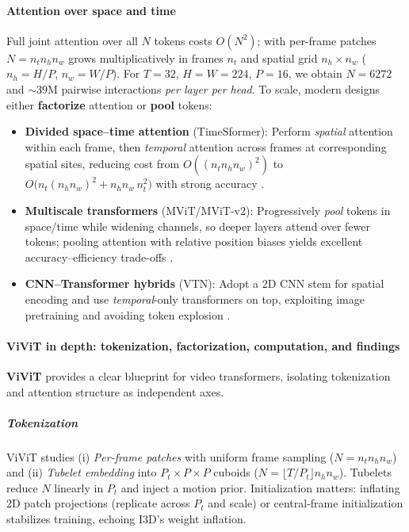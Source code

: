 \paragraph{Attention over space and time}
Full joint attention over all $N$ tokens costs $O(N^2)$; with per-frame patches $N=n_t n_h n_w$ grows multiplicatively in frames $n_t$ and spatial grid $n_h\times n_w$ ($n_h=H/P$, $n_w=W/P$). For $T{=}32$, $H{=}W{=}224$, $P{=}16$, we obtain $N=6272$ and $\sim39$M pairwise interactions \emph{per layer per head}. To scale, modern designs either \textbf{factorize} attention or \textbf{pool} tokens:
\begin{itemize}
    \item \textbf{Divided space–time attention} (TimeSformer): Perform \emph{spatial} attention within each frame, then \emph{temporal} attention across frames at corresponding spatial sites, reducing cost from $O((n_t n_h n_w)^2)$ to $O\!\big(n_t(n_h n_w)^2 + n_h n_w\,n_t^2\big)$ with strong accuracy \cite{bertasius2021_timesformer}.
    \item \textbf{Multiscale transformers} (MViT/MViT-v2): Progressively \emph{pool} tokens in space/time while widening channels, so deeper layers attend over fewer tokens; pooling attention with relative position biases yields excellent accuracy–efficiency trade-offs \cite{fan2021_mvit,li2021_improved_mvit}.
    \item \textbf{CNN–Transformer hybrids} (VTN): Adopt a 2D CNN stem for spatial encoding and use \emph{temporal}-only transformers on top, exploiting image pretraining and avoiding token explosion \cite{neimark2021_vtn}.
\end{itemize}

\paragraph{ViViT in depth: tokenization, factorization, computation, and findings}
\textbf{ViViT} \cite{arnab2021_vivit} provides a clear blueprint for video transformers, isolating tokenization and attention structure as independent axes.

\subparagraph{Tokenization}
ViViT studies (i) \emph{Per-frame patches} with uniform frame sampling ($N=n_t n_h n_w$) and (ii) \emph{Tubelet embedding} into $P_t{\times}P{\times}P$ cuboids ($N=\lfloor T/P_t\rfloor n_h n_w$). Tubelets reduce $N$ linearly in $P_t$ and inject a motion prior. Initialization matters: inflating 2D patch projections (replicate across $P_t$ and scale) or central-frame initialization stabilizes training, echoing I3D’s weight inflation.

